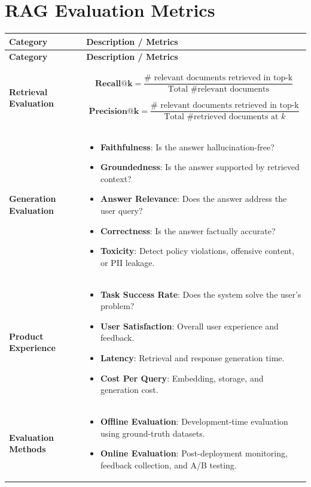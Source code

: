 \documentclass[10pt,a4paper]{article}
\begin{document}
\section{RAG Evaluation Metrics} 
\begin{longtable}{|p{}|p{}|}
\hline
\hline
\textbf{Category} & \textbf{Description / Metrics} \\
\hline
\endfirsthead

\hline
\textbf{Category} & \textbf{Description / Metrics} \\
\hline
\endhead

\hline
\endfoot

\hline
\endlastfoot

\textbf{Retrieval Evaluation} &
\[
\textbf{Recall@k} =
\frac{\# \text{ relevant documents retrieved in top-k}}
{\text{Total \# relevant documents}}
\]

\[
\textbf{Precision@k} =
\frac{\# \text{ relevant documents retrieved in top-k}}
{\text{Total \# retrieved documents at } k}
\]
\\
\hline

\textbf{Generation Evaluation} &
\begin{itemize}
    \item \textbf{Faithfulness}: Is the answer hallucination-free?
    \item \textbf{Groundedness}: Is the answer supported by retrieved context?
    \item \textbf{Answer Relevance}: Does the answer address the user query?
    \item \textbf{Correctness}: Is the answer factually accurate?
    \item \textbf{Toxicity}: Detect policy violations, offensive content, or PII leakage.
\end{itemize}
\\
\hline

\textbf{Product Experience} &
\begin{itemize}
    \item \textbf{Task Success Rate}: Does the system solve the user’s problem?
    \item \textbf{User Satisfaction}: Overall user experience and feedback.
    \item \textbf{Latency}: Retrieval and response generation time.
    \item \textbf{Cost Per Query}: Embedding, storage, and generation cost.
\end{itemize}
\\
\hline

\textbf{Evaluation Methods} &
\begin{itemize}
    \item \textbf{Offline Evaluation}: Development-time evaluation using ground-truth datasets.
    \item \textbf{Online Evaluation}: Post-deployment monitoring, feedback collection, and A/B testing.
\end{itemize}
\\
\hline

\end{longtable}
\end{document}

